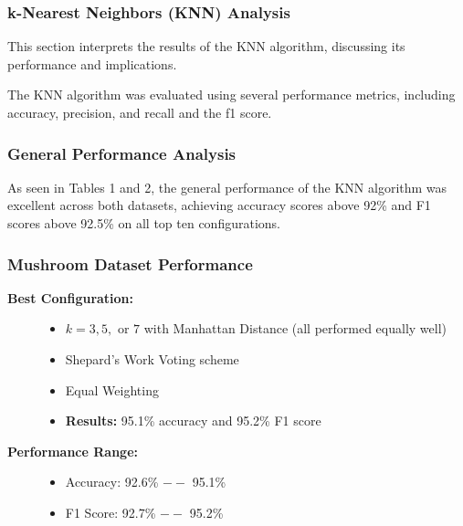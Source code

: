 \subsubsection{k-Nearest Neighbors (KNN) Analysis}
\label{subsubsec:discussion-knn}

This section interprets the results of the KNN algorithm, discussing its performance and implications.

The KNN algorithm was evaluated using several performance metrics, including accuracy, precision, and recall and the f1 score.

\subsubsection*{General Performance Analysis}
As seen in Tables 1 and 2, the general performance of the KNN algorithm was excellent across both datasets,
achieving accuracy scores above 92\% and F1 scores above 92.5\% on all top ten configurations.

\subsubsection{Mushroom Dataset Performance}

\begin{description}
    \item[\textbf{Best Configuration:}]\leavevmode
        \begin{itemize}
            \item $k = 3, 5,$ or $7$ with Manhattan Distance (all performed equally well)
            \item Shepard's Work Voting scheme
            \item Equal Weighting
            \item \textbf{Results:} 95.1\% accuracy and 95.2\% F1 score
        \end{itemize}
    
    \item[\textbf{Performance Range:}]\leavevmode
        \begin{itemize}
            \item Accuracy: 92.6\% $--$ 95.1\%
            \item F1 Score: 92.7\% $--$ 95.2\%
        \end{itemize}
\end{description}

